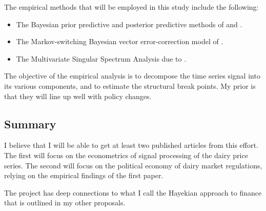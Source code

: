 \documentclass[11pt,]{article}
\def\tightlist{}
\begin{document}
The empirical methods that will be employed in this study include the
following:

\begin{itemize}
\tightlist
\item
  The Bayesian prior predictive and posterior predictive methods of
  \citet{GewekeBook2} and \citet{LancasterBook}.
\item
  The Markov-switching Bayesian vector error-correction model of
  \citet{JochmannKoop2015}.
\item
  The Multivariate Singular Spectrum Analysis due to
  \citet{HassaniThomakos2010}.
\end{itemize}

The objective of the empirical analysis is to decompose the time series
signal into its various components, and to estimate the structural break
points. My prior is that they will line up well with policy changes.

\subsection{Summary}\label{summary}

I believe that I will be able to get at least two published articles
from this effort. The first will focus on the econometrics of signal
processing of the dairy price series. The second will focus on the
political economy of dairy market regulations, relying on the empirical
findings of the first paper.

The project has deep connections to what I call the Hayekian approach to
finance that is outlined in my other proposals.

\newpage
\singlespacing 

\end{document}
